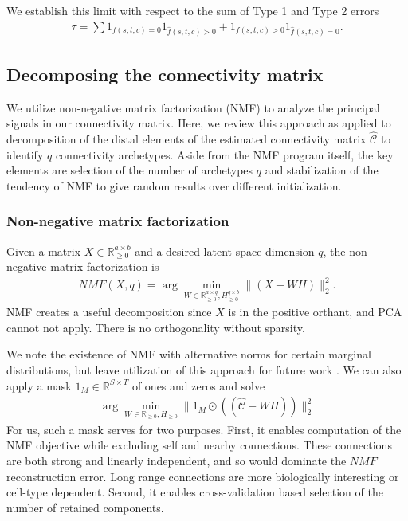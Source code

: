 We establish this limit with respect to the sum of Type 1 and Type 2 errors
\begin{eqnarray*}
\tau = \sum 1_{f(s,t,c) = 0} 1_{\hat f(s,t,c) > 0} + 1_{f(s,t,c) > 0}  1_{\hat f(s,t,c) = 0} .
\end{eqnarray*}

\subsection{Decomposing the connectivity matrix}

We utilize non-negative matrix factorization (NMF) to analyze the principal signals in our connectivity matrix.
Here, we review this approach as applied to decomposition of the distal elements of the estimated connectivity matrix $\widehat {\mathcal C}$ to identify $q$ connectivity archetypes.
Aside from the NMF program itself, the key elements are selection of the number of archetypes $q$ and stabilization of the tendency of NMF to give random results over different initialization. 

\subsubsection{Non-negative matrix factorization}

Given a matrix $X \in \mathbb R_{\geq 0}^{a \times b}$ and a desired latent space dimension $q$, the non-negative matrix factorization is
\begin{eqnarray*}
NMF(X, q) = \arg \min_{W \in \mathbb R_{\geq 0}^{a \times q} ,H_{\geq 0}^{q \times b }} \| (  X  - WH)\|_2^2.
\end{eqnarray*}
NMF creates a useful decomposition since $X$ is in the positive orthant, and PCA cannot not apply.
There is no orthogonality without sparsity.

We note the existence of NMF with alternative norms for certain marginal distributions, but leave utilization of this approach for future work \citep{Brunet2004-gi}.
We can also apply a mask $1_M \in \mathbb R^{S \times T}$ of ones and zeros and solve
\begin{eqnarray*}
\arg \min_{W \in \mathbb R_{\geq 0} ,H_{\geq 0} } \| 1_M \odot  ((\hat{  \mathcal C}  - WH))\|_2^2
\end{eqnarray*}
For us, such a mask serves for two purposes.
First, it enables computation of the NMF objective while excluding self and nearby connections.
These connections are both strong and linearly independent, and so would dominate the $NMF$ reconstruction error.
Long range connections are more biologically interesting or cell-type dependent.
Second, it enables cross-validation based selection of the number of retained components.

